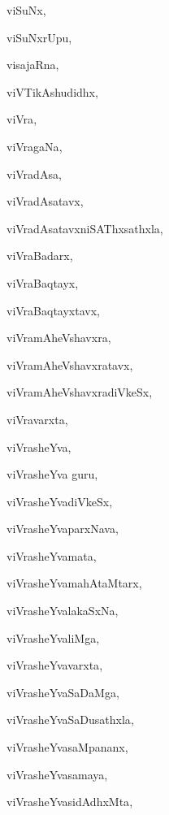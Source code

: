 \begin{multicols}{2}
{viSuNx}, \pageref{viSuNx}

{viSuNxrUpu}, \pageref{viSuNxrUpu}

{visajaRna}, \pageref{visajaRna}

{viVTikAshudidhx}, \pageref{viVTikAshudidhx}

{viVra}, \pageref{viVra}

{viVragaNa}, \pageref{viVragaNa}

{viVradAsa}, \pageref{viVradAsa}

{viVradAsatavx}, \pageref{viVradAsatavx}

{viVradAsatavxniSAThxsathxla}, \pageref{viVradAsatavxniSAThxsathxla}

{viVraBadarx}, \pageref{viVraBadarx}

{viVraBaqtayx}, \pageref{viVraBaqtayx}

{viVraBaqtayxtavx}, \pageref{viVraBaqtayxtavx}

{viVramAheVshavxra}, \pageref{viVramAheVshavxra}

{viVramAheVshavxratavx}, \pageref{viVramAheVshavxratavx}

{viVramAheVshavxradiVkeSx}, \pageref{viVramAheVshavxradiVkeSx}

{viVravarxta}, \pageref{viVravarxta}

{viVrasheYva}, \pageref{viVrasheYva}

{viVrasheYva guru}, \pageref{viVrasheYvaguru}

{viVrasheYvadiVkeSx}, \pageref{viVrasheYvadiVkeSx}

{viVrasheYvaparxNava}, \pageref{viVrasheYvaparxNava}

{viVrasheYvamata}, \pageref{viVrasheYvamata}

{viVrasheYvamahAtaMtarx}, \pageref{viVrasheYvamahAtaMtarx}

{viVrasheYvalakaSxNa}, \pageref{viVrasheYvalakaSxNa}

{viVrasheYvaliMga}, \pageref{viVrasheYvaliMga}

{viVrasheYvavarxta}, \pageref{viVrasheYvavarxta}

{viVrasheYvaSaDaMga}, \pageref{viVrasheYvaSaDaMga}

{viVrasheYvaSaDusathxla}, \pageref{viVrasheYvaSaDusathxla}

{viVrasheYvasaMpananx}, \pageref{viVrasheYvasaMpananx}

{viVrasheYvasamaya}, \pageref{viVrasheYvasamaya}

{viVrasheYvasidAdhxMta}, \pageref{viVrasheYvasidAdhxMta}


\end{multicols}
